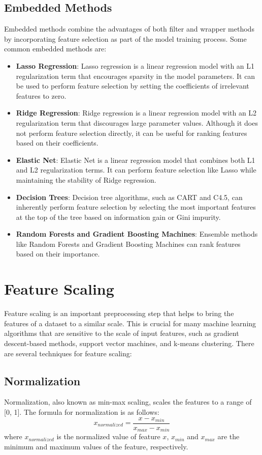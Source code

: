 \documentclass[12pt]{article}
\begin{document}
\subsection{Embedded Methods}
Embedded methods combine the advantages of both filter and wrapper methods by incorporating feature selection as part of the model training process. Some common embedded methods are:

\begin{itemize}
\item \textbf{Lasso Regression}: Lasso regression is a linear regression model with an L1 regularization term that encourages sparsity in the model parameters. It can be used to perform feature selection by setting the coefficients of irrelevant features to zero.
\item \textbf{Ridge Regression}: Ridge regression is a linear regression model with an L2 regularization term that discourages large parameter values. Although it does not perform feature selection directly, it can be useful for ranking features based on their coefficients.
\item \textbf{Elastic Net}: Elastic Net is a linear regression model that combines both L1 and L2 regularization terms. It can perform feature selection like Lasso while maintaining the stability of Ridge regression.
\item \textbf{Decision Trees}: Decision tree algorithms, such as CART and C4.5, can inherently perform feature selection by selecting the most important features at the top of the tree based on information gain or Gini impurity.
\item \textbf{Random Forests and Gradient Boosting Machines}: Ensemble methods like Random Forests and Gradient Boosting Machines can rank features based on their importance.
\end{itemize}

\section{Feature Scaling}
Feature scaling is an important preprocessing step that helps to bring the features of a dataset to a similar scale. This is crucial for many machine learning algorithms that are sensitive to the scale of input features, such as gradient descent-based methods, support vector machines, and k-means clustering. There are several techniques for feature scaling:

\subsection{Normalization}
Normalization, also known as min-max scaling, scales the features to a range of [0, 1]. The formula for normalization is as follows:
\begin{equation}
x_{normalized} = \frac{x - x_{min}}{x_{max} - x_{min}}
\end{equation}
where $x_{normalized}$ is the normalized value of feature $x$, $x_{min}$ and $x_{max}$ are the minimum and maximum values of the feature, respectively.
\end{document}
